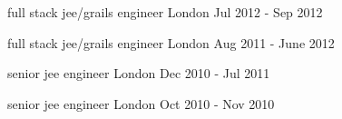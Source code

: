 \begin{cventries}
    \cventry
    {full stack jee/grails engineer}
    {}
    {London}
    {Jul 2012 - Sep 2012}
    {}
    {}

    \cventry
    {full stack jee/grails engineer}
    {}
    {London}
    {Aug 2011 - June 2012}
    {}
    {}

    \cventry
    {senior jee engineer}
    {}
    {London}
    {Dec 2010 - Jul 2011}
    {}
    {}

    \cventry
    {senior jee engineer}
    {}
    {London}
    {Oct 2010 - Nov 2010}
    {}
    {}
\end{cventries}



